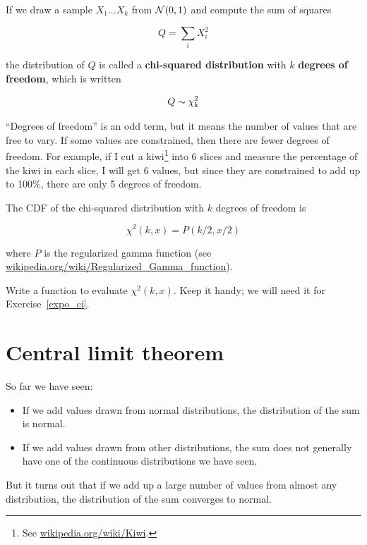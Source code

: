\documentclass[12pt]{book}
\begin{document}
If we draw a sample $X_1 ... X_k$ from $\mathcal{N}(0,1)$ and compute
the sum of squares

\[ Q = \sum_i X_i^2 \]

the distribution of $Q$ is called a {\bf chi-squared distribution} with
$k$ {\bf degrees of freedom}, which is written

\[ Q \sim \chi_k^2 \]

``Degrees of freedom'' is an odd term, but it means the number of
values that are free to vary.  If some values are constrained, then
there are fewer degrees of freedom.  For example, if I cut a
kiwi\footnote{See \url{wikipedia.org/wiki/Kiwi}.} into 6 slices and
measure the percentage of the kiwi in each slice, I will get 6 values,
but since they are constrained to add up to 100\%, there are only 5
degrees of freedom.

The CDF of the chi-squared distribution with $k$ degrees of freedom is

\[ \chi^2(k, x) = P(k/2, x/2) \]

where $P$ is the regularized gamma function (see
\url{wikipedia.org/wiki/Regularized_Gamma_function}).

\begin{ex}
\label{chi-squared}

Write a function to evaluate $\chi^2(k, x)$.  Keep it handy; we will
need it for Exercise~\ref{expo_ci}.

\end{ex}



\section{Central limit theorem}
\label{CLT}

So far we have seen:

\begin{itemize}

\item If we add values drawn from normal distributions, the distribution
of the sum is normal.

\item If we add values drawn from other distributions, the sum does not
generally have one of the continuous distributions we have seen.

\end{itemize}

But it turns out that if we add up a large number of values from
almost any distribution, the distribution of the sum converges to
normal.
\end{document}
